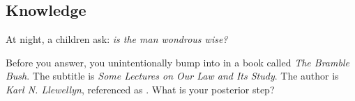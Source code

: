 \documentclass[a4paper]{exam}
\theoremstyle{plain}
\begin{document}


\subsection{Knowledge}

At night, a children ask: \textit{is the man wondrous wise?}
\vspace{.5cm}

Before you answer, you unintentionally bump into in a book called \textit{The Bramble Bush}. The subtitle is \textit{Some Lectures on Our Law and Its Study}. The author is \textit{Karl N. Llewellyn}, referenced as \cite{llewellyn1930bramble}. What is your posterior step? 






\end{document}
